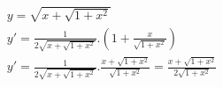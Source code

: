 \begin{ex}
\begin{align}
&y=\sqrt{x+\sqrt{1+x^2}}\nonumber\\
&y'=\frac{1}{2\sqrt{x+\sqrt{1+x^2}}}.\left(1+\frac{x}{\sqrt{1+x^2}}\right)\nonumber\\
&y'=\frac{1}{2\sqrt{x+\sqrt{1+x^2}}}.\frac{x+\sqrt{1+x^2}}{\sqrt{1+x^2}}=\frac{x+\sqrt{1+x^2}}{2\sqrt{1+x^2}}\nonumber
\end{align}
\end{ex}